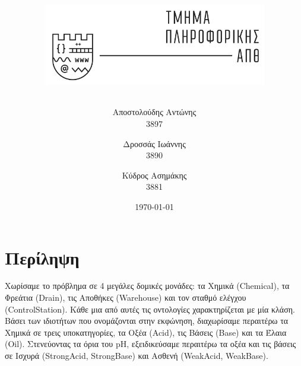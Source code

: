 \documentclass{article}
\title{\begin{flushright}
    \includegraphics[scale=0.5]{images/authstamp.png}
    \quad
    \tb{Ανάπτυξη Οντολογίας Χημικού Εργοστασίου σε \protege}
\end{flushright}}
\author{
    Αποστολούδης Αντώνης\\
    3897\\
    \texttt{\lt{antoapos@csd.auth.gr}}
    \and
    Δροσσάς Ιωάννης\\
    3890\\
    \texttt{\lt{idrossas@csd.auth.gr}}
    \and
    Κύδρος Ασημάκης\\
    3881\\
    \texttt{\lt{asimakis@csd.auth.gr}}
}
\date{\today}
\newcommand{\lt}[1]{\latintext #1\greektext}
\begin{document}
\maketitle

\section*{Περίληψη}
Χωρίσαμε το πρόβλημα σε 4 μεγάλες δομικές μονάδες: τα Χημικά (\lt{Chemical}), τα Φρεάτια (\lt{Drain}), τις Αποθήκες (\lt{Warehouse}) και τον σταθμό ελέγχου (\lt{ControlStation}). Κάθε μια από αυτές τις οντολογίες χαρακτηρίζεται με μία κλάση.\\

Βάσει των ιδιοτήτων που ονομάζονται στην εκφώνηση, διαχωρίσαμε περαιτέρω τα Χημικά σε τρεις υποκατηγορίες, τα Οξέα (\lt{Acid}), τις Βάσεις (\lt{Base}) και τα Έλαια (\lt{Oil}). Στενεύοντας τα όρια του \lt{pH}, εξειδικεύσαμε περαιτέρω τα οξέα και τις βάσεις σε Ισχυρά (\lt{StrongAcid, StrongBase}) και Ασθενή (\lt{WeakAcid, WeakBase}).

\newpage
\end{document}
